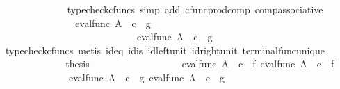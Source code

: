 \begin{isabellebody}
\ \ \ \ \ \ \ \ \ \ \ \ \isamarkupfalse%
\ {\isacharparenleft}{\kern0pt}typecheck{\isacharunderscore}{\kern0pt}cfuncs{\isacharcomma}{\kern0pt}\ simp\ add{\isacharcolon}{\kern0pt}\ cfunc{\isacharunderscore}{\kern0pt}prod{\isacharunderscore}{\kern0pt}comp\ comp{\isacharunderscore}{\kern0pt}associative{}{\isacharparenright}{\kern0pt}\isanewline
\ \ \ \ \ \ \ \ \ \ \isamarkupfalse%
\ \isamarkupfalse%
\ {\isachardoublequoteopen}{\isachardot}{\kern0pt}{\isachardot}{\kern0pt}{\isachardot}{\kern0pt}\ {\isacharequal}{\kern0pt}\ {\isasymlangle}eval{\isacharunderscore}{\kern0pt}func\ A\ {\isasymOmega}\ {\isasymcirc}\isactrlsub c\ {\isasymlangle}{\isasymt}{\isacharcomma}{\kern0pt}\ g{\isasymrangle}{\isacharcomma}{\kern0pt}\isanewline
\ \ \ \ \ \ \ \ \ \ \ \ \ \ \ \ \ \ \ \ \ \ \ \ \ \ \ \ eval{\isacharunderscore}{\kern0pt}func\ A\ {\isasymOmega}\ {\isasymcirc}\isactrlsub c\ {\isasymlangle}{\isasymf}{\isacharcomma}{\kern0pt}\ g{\isasymrangle}{\isasymrangle}{\isachardoublequoteclose}\ \ \ \ \isanewline
\ \ \ \ \ \ \ \ \ \ \ \ \isamarkupfalse%
\ {\isacharparenleft}{\kern0pt}typecheck{\isacharunderscore}{\kern0pt}cfuncs{\isacharcomma}{\kern0pt}\ metis\ id{}{\isacharunderscore}{\kern0pt}eq\ id{}{\isacharunderscore}{\kern0pt}is\ id{\isacharunderscore}{\kern0pt}left{\isacharunderscore}{\kern0pt}unit{}\ id{\isacharunderscore}{\kern0pt}right{\isacharunderscore}{\kern0pt}unit{}\ terminal{\isacharunderscore}{\kern0pt}func{\isacharunderscore}{\kern0pt}unique{\isacharparenright}{\kern0pt}\isanewline
\ \ \ \ \ \ \ \ \ \ \isamarkupfalse%
\ \isamarkupfalse%
\ {\isacharquery}{\kern0pt}thesis\isacommand{{\isachardot}{\kern0pt}}\isamarkupfalse%
\isanewline
\ \ \ \ \ \ \ \ \isamarkupfalse%
\isanewline
\ \ \ \ \ \ \ \ \isamarkupfalse%
\ {\isachardoublequoteopen}{\isasymlangle}eval{\isacharunderscore}{\kern0pt}func\ A\ {\isasymOmega}\ {\isasymcirc}\isactrlsub c\ {\isasymlangle}{\isasymt}{\isacharcomma}{\kern0pt}\ f{\isasymrangle}{\isacharcomma}{\kern0pt}\ eval{\isacharunderscore}{\kern0pt}func\ A\ {\isasymOmega}\ {\isasymcirc}\isactrlsub c\ {\isasymlangle}{\isasymf}{\isacharcomma}{\kern0pt}\ f{\isasymrangle}{\isasymrangle}\ {\isacharequal}{\kern0pt}\ \isanewline
\ \ \ \ \ \ \ \ \ \ \ \ \ \ {\isasymlangle}eval{\isacharunderscore}{\kern0pt}func\ A\ {\isasymOmega}\ {\isasymcirc}\isactrlsub c\ {\isasymlangle}{\isasymt}{\isacharcomma}{\kern0pt}\ g{\isasymrangle}{\isacharcomma}{\kern0pt}\ eval{\isacharunderscore}{\kern0pt}func\ A\ {\isasymOmega}\ {\isasymcirc}\isactrlsub c\ {\isasymlangle}{\isasymf}{\isacharcomma}{\kern0pt}\ g{\isasymrangle}{\isasymrangle}{\isachardoublequoteclose}\isanewline

\end{isabellebody}
